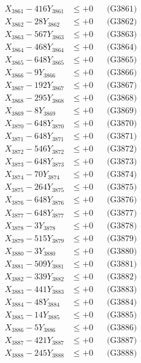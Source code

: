 \documentclass[a4paper,10pt]{article}
\begin{document}
{\begin{align}
\allowbreak
X_{3861} - 416Y_{3861} &\leq +0 && \text{(G3861)} \\
X_{3862} - 28Y_{3862} &\leq +0 && \text{(G3862)} \\
X_{3863} - 567Y_{3863} &\leq +0 && \text{(G3863)} \\
X_{3864} - 468Y_{3864} &\leq +0 && \text{(G3864)} \\
X_{3865} - 648Y_{3865} &\leq +0 && \text{(G3865)} \\
X_{3866} - 9Y_{3866} &\leq +0 && \text{(G3866)} \\
X_{3867} - 192Y_{3867} &\leq +0 && \text{(G3867)} \\
X_{3868} - 295Y_{3868} &\leq +0 && \text{(G3868)} \\
X_{3869} - 8Y_{3869} &\leq +0 && \text{(G3869)} \\
X_{3870} - 648Y_{3870} &\leq +0 && \text{(G3870)} \\
\allowbreak
X_{3871} - 648Y_{3871} &\leq +0 && \text{(G3871)} \\
X_{3872} - 546Y_{3872} &\leq +0 && \text{(G3872)} \\
X_{3873} - 648Y_{3873} &\leq +0 && \text{(G3873)} \\
X_{3874} - 70Y_{3874} &\leq +0 && \text{(G3874)} \\
X_{3875} - 264Y_{3875} &\leq +0 && \text{(G3875)} \\
X_{3876} - 648Y_{3876} &\leq +0 && \text{(G3876)} \\
X_{3877} - 648Y_{3877} &\leq +0 && \text{(G3877)} \\
X_{3878} - 3Y_{3878} &\leq +0 && \text{(G3878)} \\
X_{3879} - 515Y_{3879} &\leq +0 && \text{(G3879)} \\
X_{3880} - 3Y_{3880} &\leq +0 && \text{(G3880)} \\
\allowbreak
X_{3881} - 509Y_{3881} &\leq +0 && \text{(G3881)} \\
X_{3882} - 339Y_{3882} &\leq +0 && \text{(G3882)} \\
X_{3883} - 441Y_{3883} &\leq +0 && \text{(G3883)} \\
X_{3884} - 48Y_{3884} &\leq +0 && \text{(G3884)} \\
X_{3885} - 14Y_{3885} &\leq +0 && \text{(G3885)} \\
X_{3886} - 5Y_{3886} &\leq +0 && \text{(G3886)} \\
X_{3887} - 421Y_{3887} &\leq +0 && \text{(G3887)} \\
X_{3888} - 245Y_{3888} &\leq +0 && \text{(G3888)} \\

\end{align}}
\end{document}
